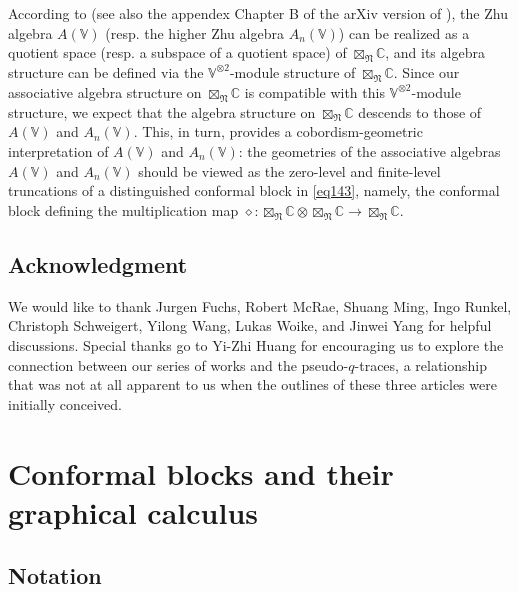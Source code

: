 \documentclass[11pt,b5paper,notitlepage]{article}
\theoremstyle{definition}
\theoremstyle{plain}
\newcommand{\Vbb}{\mathbb V}
\newcommand{\Cbb}{\mathbb C}
\newcommand{\<}{\left\langle}
\renewcommand{\>}{\right\rangle}
\newcommand{\fn}{\mathfrak{N}}
\numberwithin{equation}{section}
\begin{document}
According to \cite{Li-regular-Zhu,Li-regular-AnV} (see also the appendex Chapter B of the arXiv version of \cite{GZ1}), the Zhu algebra $A(\Vbb)$ (resp. the higher Zhu algebra $A_n(\Vbb)$) can be realized as a quotient space (resp. a subspace of a quotient space) of $\boxtimes_\fn\Cbb$, and its algebra structure can be defined via the $\Vbb^{\otimes2}$-module structure of $\boxtimes_\fn\Cbb$. Since our associative algebra structure on $\boxtimes_\fn\Cbb$ is compatible with this $\Vbb^{\otimes2}$-module structure, we expect that the algebra structure on $\boxtimes_\fn\Cbb$ descends to those of $A(\Vbb)$ and $A_n(\Vbb)$. This, in turn, provides a cobordism-geometric interpretation of $A(\Vbb)$ and $A_n(\Vbb)$: the geometries of the associative algebras $A(\Vbb)$ and $A_n(\Vbb)$ should be viewed as the zero-level and finite-level truncations of a distinguished conformal block in \eqref{eq143}, namely, the conformal block defining the multiplication map $\diamond:\boxtimes_\fn\Cbb\otimes\boxtimes_\fn\Cbb\rightarrow\boxtimes_\fn\Cbb$.





\subsection*{Acknowledgment}

We would like to thank Jurgen Fuchs, Robert McRae, Shuang Ming, Ingo Runkel, Christoph Schweigert, Yilong Wang,  Lukas Woike, and Jinwei Yang for helpful discussions. Special thanks go to Yi-Zhi Huang for encouraging us to explore the connection between our series of works \cite{GZ1,GZ2,GZ3} and the pseudo-$q$-traces, a relationship that was not at all apparent to us when the outlines of these three articles were initially conceived.














\section{Conformal blocks and their graphical calculus}



\subsection{Notation}\label{lb32}
\end{document}
